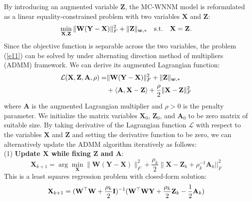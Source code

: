 \documentclass[10pt,twocolumn,letterpaper,sort&compress]{article}
\begin{document}
By introducing an augmented variable $\mathbf{Z}$, the MC-WNNM model is reformulated as a linear equality-constrained problem with two variables $\mathbf{X}$ and $\mathbf{Z}$:
\vspace{-3mm}
\begin{equation}
\label{e11}
\vspace{-3mm}
\min_{\mathbf{X},\mathbf{Z}}\|\mathbf{W}(\mathbf{Y}-\mathbf{X})\|_{F}^{2}
+
\|\mathbf{Z}\|_{\bm{w},*}
\quad
\text{s.t.}
\quad
\mathbf{X}=\mathbf{Z}.
\end{equation}
Since the objective function is separable across the two variables, the problem (\ref{e11}) can be solved by under alternating direction method of multipliers (ADMM) framework. We can derive its augmented Lagrangian function:
\vspace{-3mm}
\begin{equation}
\label{e12}
\vspace{-3mm}
\begin{split}
\mathcal{L}(\mathbf{X},\mathbf{Z},\mathbf{A},\rho)
=
&\|\mathbf{W}(\mathbf{Y}-\mathbf{X})\|_{F}^{2}
+
\|\mathbf{Z}\|_{\bm{w},*}
\\
&
+
\langle
\mathbf{A},\mathbf{X}-\mathbf{Z}
\rangle
+
\frac{\rho}{2}
\|\mathbf{X}-\mathbf{Z}\|_{F}^{2}
\end{split}
\end{equation}
where $\mathbf{A}$ is the augmented Lagrangian multiplier and $\rho>0$ is the penalty parameter. We initialize the matrix variables $\mathbf{X}_{0}$, $\mathbf{Z}_{0}$, and $\mathbf{A}_{0}$ to be zero matrix of suitable size. By taking derivative of the Lagrangian function $\mathcal{L}$ with respect to the variables $\mathbf{X}$ and $\mathbf{Z}$ and setting the derivative function to be zero, we can alternatively update the ADMM algorithm iteratively as follows:
\\
(1) \textbf{Update $\mathbf{X}$ while fixing $\mathbf{Z}$ and $\mathbf{A}$}:
\vspace{-2mm}
\begin{equation}
\label{e13}
\mathbf{X}_{k+1}
=
\arg\min_{\mathbf{X}}
\|\mathbf{W}(\mathbf{Y}-\mathbf{X})\|_{F}^{2} 
+
\frac{\rho_{k}}{2}\|\mathbf{X} - \mathbf{Z}_{k} + \rho_{k}^{-1}\mathbf{A}_{k}||_{F}^{2}
\end{equation}
This is a least squares regression problem with closed-form solution:
\vspace{-3mm}
\begin{equation}
\label{e14}
\vspace{-3mm}
\mathbf{X}_{k+1}
=
(\mathbf{W}^{\top}\mathbf{W}+\frac{\rho_{k}}{2}\mathbf{I})^{-1}
(\mathbf{W}^{\top}\mathbf{W}\mathbf{Y} + \frac{\rho_{k}}{2}\mathbf{Z}_{k} -\frac{1}{2}\mathbf{A}_{k})
\end{equation}
\end{document}
